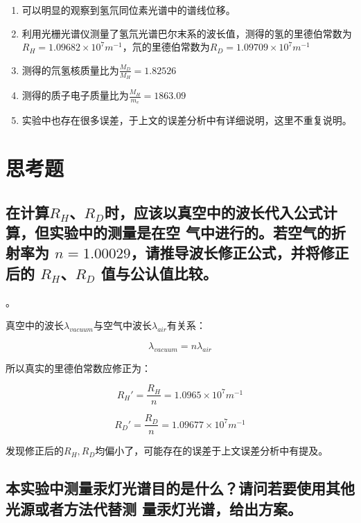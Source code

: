 \documentclass[a4paper,UTF8]{ctexart}
\begin{document}
\begin{enumerate}
    \item 可以明显的观察到氢氘同位素光谱中的谱线位移。
    \item 利用光栅光谱仪测量了氢氘光谱巴尔末系的波长值，测得的氢的里德伯常数为$R_{H} = 1.09682 \times 10^7 m^{-1}$，氘的里德伯常数为$R_{D}= 1.09709 \times 10^7 m^{-1}$
    \item 测得的氘氢核质量比为$\frac{M_{D}}{M_{H}} = 1.82526$
    \item 测得的质子电子质量比为$\frac{M_{H}}{m_{e}} = 1863.09$
    \item 实验中也存在很多误差，于上文的误差分析中有详细说明，这里不重复说明。
\end{enumerate}

\section{思考题}

\subsection{在计算$R_{H}$、$R_{D}$时，应该以真空中的波长代入公式计算，但实验中的测量是在空
气中进行的。若空气的折射率为 $n=1.00029$，请推导波长修正公式，并将修正后的 $R_{H}$、$R_{D}$ 值与公认值比较。}。

真空中的波长$\lambda_{vacuum}$与空气中波长$\lambda_{air}$有关系：

\begin{equation}
    \lambda_{vacuum} = n \lambda_{air}
\end{equation}

所以真实的里德伯常数应修正为：

\begin{equation}
    R_{H}' = \frac{R_{H}}{n} = 1.0965 \times 10^7 m^{-1}
\end{equation}

\begin{equation}
    R_{D}' = \frac{R_{D}}{n} = 1.09677 \times 10^7 m^{-1}
\end{equation}

发现修正后的$R_{H},R_{D}$均偏小了，可能存在的误差于上文误差分析中有提及。

\subsection{本实验中测量汞灯光谱目的是什么？请问若要使用其他光源或者方法代替测
量汞灯光谱，给出方案。}
\end{document}
